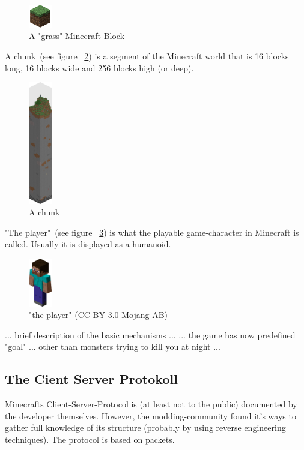 \begin{figure}[h]
  \centering
    \includegraphics[width=1cm]{graphics/block}
  \caption{A "grass" Minecraft Block}
  \label{mc_block}
\end{figure}
        
A chunk~(see figure ~\ref{mc_chunk}) is a segment of the Minecraft world that is 16 blocks long, 16 blocks wide and 256 blocks high (or deep).~\cite{mcwiki_chunks}

\begin{figure}[h]
  \centering
    \includegraphics[width=1cm]{graphics/chunk}
  \caption{A chunk}
  \label{mc_chunk}
\end{figure}

"The player"~(see figure ~\ref{mc_player}) is what the playable game-character in Minecraft is called. Usually it is displayed as a humanoid.

\begin{figure}[h]
  \centering
    \includegraphics[width=1cm]{graphics/player}
  \caption{"the player" (CC-BY-3.0 Mojang AB) \cite{image_mob}}
  \label{mc_player}
\end{figure}

... brief description of the basic mechanisms ...
... the game has now predefined "goal" ... other than monsters trying to kill you at night ...

        \subsection{The Cient Server Protokoll}
Minecrafts Client-Server-Protocol is (at least not to the public) documented by the developer themselves. However, the modding-community found it's ways to gather full knowledge of its structure (probably by using reverse engineering techniques). The protocol is based on packets. 

